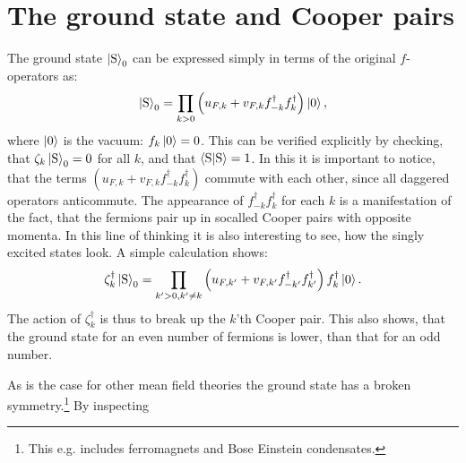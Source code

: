 \section{The ground state and Cooper pairs}
The ground state $\ket{\text{S}}_0$ can be expressed simply in terms of the original $f$-operators as:
\begin{equation}
\ket{\text{S}}_0 = \prod_{k > 0} \left(u_{F,k} + v_{F,k}f^\dagger_{-k}f^\dagger_k\right)\ket{0},
\end{equation} 
where $\ket{0}$ is the vacuum: $f_k\ket{0} = 0$. This can be verified explicitly by checking, that $\zeta_k\ket{\text{S}}_0 = 0$ for all $k$, and that 
$\braket{\text{S}|\text{S}} = 1$. In this it is important to notice, that the terms $(u_{F,k} + v_{F,k}f^\dagger_{-k}f^\dagger_k)$ commute with each other, since all daggered operators anticommute. The appearance of $f^\dagger_{-k}f^\dagger_k$ for each $k$ is a manifestation of the fact, that the fermions pair up in socalled Cooper pairs with opposite momenta. In this line of thinking it is also interesting to see, how the singly excited states look. A simple calculation shows:
\begin{equation}
\zeta^\dagger_k\ket{\text{S}}_0 = \prod_{k' > 0, k' \neq k }\left(u_{F,k'} + v_{F,k'}f^\dagger_{-k'}f^\dagger_{k'}\right)f^\dagger_k\ket{0}.
\end{equation}
The action of $\zeta^\dagger_k$ is thus to break up the $k$'th Cooper pair. This also shows, that the ground state for an even number of fermions is lower, than that for an odd number. 

As is the case for other mean field theories the ground state has a broken symmetry.\footnote{This e.g. includes ferromagnets and Bose Einstein condensates.} By inspecting 
